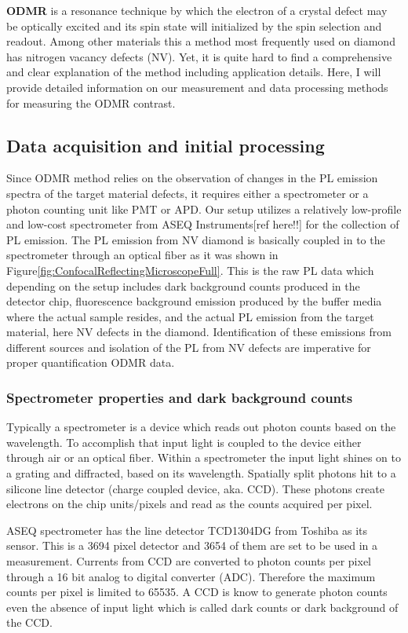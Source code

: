 \textbf{ODMR} is a resonance technique by which the electron of a crystal 
defect may be optically excited and its spin state will initialized by the 
spin selection and readout. Among other materials this a method most 
frequently used on diamond has nitrogen vacancy defects (NV). Yet, it is
quite hard to find a comprehensive and clear explanation of the method 
including application details. Here, I will provide detailed information on
our measurement and data processing methods for measuring the ODMR contrast.

\subsection{Data acquisition and initial processing}
Since ODMR method relies on the observation of changes in the PL emission 
spectra of the target material defects, it requires either a spectrometer 
or a photon counting unit like PMT or APD. Our setup utilizes a relatively 
low-profile and low-cost spectrometer from ASEQ Instruments[ref here!!] for
the collection of PL emission. The PL emission from NV diamond is basically  
coupled in to the spectrometer through an optical fiber as it was shown in 
Figure\ref{fig:ConfocalReflectingMicroscopeFull}. This is the raw PL data 
which depending on the setup includes dark background counts produced in the
detector chip, fluorescence background emission produced by the buffer media
where the actual sample resides, and the actual PL emission from the target
material, here NV defects in the diamond. Identification of these emissions 
from different sources and isolation of the PL from NV defects are imperative
for proper quantification ODMR data.

\subsubsection{Spectrometer properties and dark background counts}\label{subsubsec:darkBGMethod}
Typically a spectrometer is a device which reads out photon counts based on
the wavelength. To accomplish that input light is coupled to the device either
through air or an optical fiber. Within a spectrometer the input light 
shines on to a grating and diffracted, based on its wavelength. Spatially 
split photons hit to a silicone line detector (charge coupled device, aka. 
CCD). These photons create electrons on the chip units/pixels and read as
the counts acquired per pixel. 

ASEQ spectrometer has the line detector TCD1304DG from Toshiba as its sensor.
This is a 3694 pixel detector and 3654 of them are set to be used in a measurement.
Currents from CCD are converted to photon counts per pixel through a 16 bit
analog to digital converter (ADC). Therefore the maximum counts per pixel
is limited to 65535. A CCD is know to generate photon counts even the absence 
of input light which is called dark counts or dark background of the CCD.


